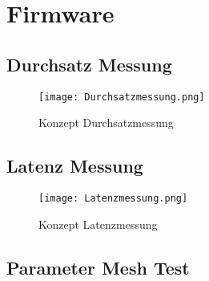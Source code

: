 	\clearpage
\section{Firmware}\label{sec:Firmware}


\newpage


\subsection{Durchsatz Messung}\label{subsec:DurchsatzMessung}

\begin{figure}[H]
	\centering
	\texttt{[image: Durchsatzmessung.png]}
	\caption{Konzept Durchsatzmessung}\label{fig:KonzeptDurchsatzmessung}
\end{figure}

\subsection{Latenz Messung}\label{subsec:LatenzMessung}

\begin{figure}[H]
	\centering
	\texttt{[image: Latenzmessung.png]}
	\caption{Konzept Latenzmessung}\label{fig:Konzept Latenzmessung}
\end{figure}
\newpage





\subsection{Parameter Mesh Test}\label{subsec:ParameterMeshTest}



